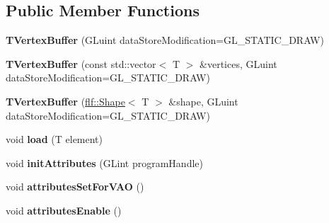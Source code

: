 \subsection*{Public Member Functions}
\begin{DoxyCompactItemize}
\item 
{\bfseries T\+Vertex\+Buffer} (G\+Luint data\+Store\+Modification=G\+L\+\_\+\+S\+T\+A\+T\+I\+C\+\_\+\+D\+R\+AW)\hypertarget{classflw_1_1flc_1_1TVertexBuffer_a25fe31ad21ba02a3b187fe874795143e}{}\label{classflw_1_1flc_1_1TVertexBuffer_a25fe31ad21ba02a3b187fe874795143e}

\item 
{\bfseries T\+Vertex\+Buffer} (const std\+::vector$<$ T $>$ \&vertices, G\+Luint data\+Store\+Modification=G\+L\+\_\+\+S\+T\+A\+T\+I\+C\+\_\+\+D\+R\+AW)\hypertarget{classflw_1_1flc_1_1TVertexBuffer_a2e8be908b0f56009547c9b9e501147ca}{}\label{classflw_1_1flc_1_1TVertexBuffer_a2e8be908b0f56009547c9b9e501147ca}

\item 
{\bfseries T\+Vertex\+Buffer} (\hyperlink{classflw_1_1flf_1_1Shape}{flf\+::\+Shape}$<$ T $>$ \&shape, G\+Luint data\+Store\+Modification=G\+L\+\_\+\+S\+T\+A\+T\+I\+C\+\_\+\+D\+R\+AW)\hypertarget{classflw_1_1flc_1_1TVertexBuffer_acb95e0c4a681bf16a57a348fef27fccb}{}\label{classflw_1_1flc_1_1TVertexBuffer_acb95e0c4a681bf16a57a348fef27fccb}

\item 
void {\bfseries load} (T element)\hypertarget{classflw_1_1flc_1_1TVertexBuffer_a2093c68db61fd6a82378e94bb6a5603d}{}\label{classflw_1_1flc_1_1TVertexBuffer_a2093c68db61fd6a82378e94bb6a5603d}

\item 
void {\bfseries init\+Attributes} (G\+Lint program\+Handle)\hypertarget{classflw_1_1flc_1_1TVertexBuffer_adffb468132a9a983e72cbc3c67408554}{}\label{classflw_1_1flc_1_1TVertexBuffer_adffb468132a9a983e72cbc3c67408554}

\item 
void {\bfseries attributes\+Set\+For\+V\+AO} ()\hypertarget{classflw_1_1flc_1_1TVertexBuffer_a9b10436de21ac6b51c77a0d5de80bc6c}{}\label{classflw_1_1flc_1_1TVertexBuffer_a9b10436de21ac6b51c77a0d5de80bc6c}

\item 
void {\bfseries attributes\+Enable} ()\hypertarget{classflw_1_1flc_1_1TVertexBuffer_a55e8bedfc69a84a76a77a76c0c328195}{}\label{classflw_1_1flc_1_1TVertexBuffer_a55e8bedfc69a84a76a77a76c0c328195}


\end{DoxyCompactItemize}

